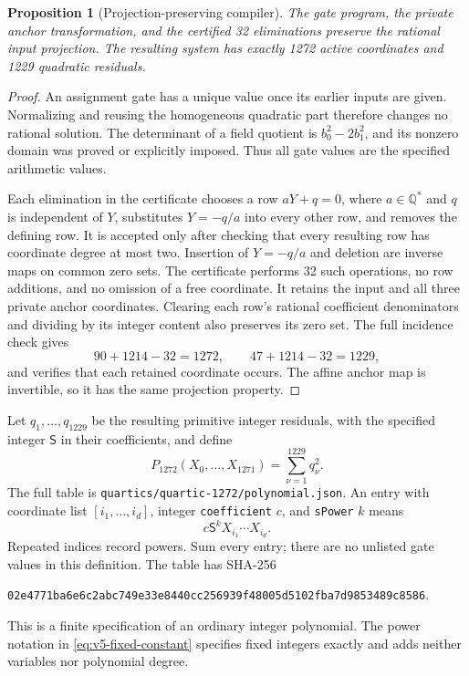 \documentclass[11pt]{article}
\newtheorem{proposition}[theorem]{Proposition}
\theoremstyle{definition}
\theoremstyle{remark}
\newcommand{\Q}{\mathbb Q}
\begin{document}
\begin{proposition}[Projection-preserving compiler]
\label{prop:v5-compiler-projection}
The gate program, the private anchor transformation, and the
certified 32 eliminations preserve the rational input projection.
The resulting system has exactly 1272 active coordinates and
1229 quadratic residuals.
\end{proposition}
\begin{proof}
An assignment gate has a unique value once its earlier inputs are
given. Normalizing and reusing the homogeneous quadratic part
therefore changes no rational solution. The determinant of a
field quotient is $b_0^2-2b_1^2$, and its nonzero domain was
proved or explicitly imposed. Thus all gate values are the
specified arithmetic values.

Each elimination in the certificate chooses a row $aY+q=0$,
where $a\in\Q^*$ and $q$ is independent of $Y$, substitutes
$Y=-q/a$ into every other row, and removes the defining row.
It is accepted only after checking that every resulting row has
coordinate degree at most two. Insertion of $Y=-q/a$ and deletion
are inverse maps on common zero sets. The certificate performs
32 such operations, no row additions, and no omission of a free
coordinate. It retains the input and all three private anchor
coordinates. Clearing each row's rational coefficient denominators
and dividing by its integer content also preserves its zero set.
The full incidence check gives
\[
 90+1214-32=1272,\qquad47+1214-32=1229,
\]
and verifies that each retained coordinate occurs. The affine
anchor map is invertible, so it has the same projection property.
\end{proof}

Let $q_1,\ldots,q_{1229}$ be the resulting primitive integer
residuals, with the specified integer $\mathsf S$ in their
coefficients, and define
\begin{equation}\label{eq:v5-final-polynomial}
 P_{1272}(X_0,\ldots,X_{1271})=\sum_{\nu=1}^{1229}q_\nu^2.
\end{equation}
The full table is \nolinkurl{quartics/quartic-1272/polynomial.json}.
An entry with coordinate list $[i_1,\ldots,i_d]$, integer
\texttt{coefficient} $c$, and \texttt{sPower} $k$ means
\[
 c\mathsf S^kX_{i_1}\cdots X_{i_d}.
\]
Repeated indices record powers. Sum every entry; there are no
unlisted gate values in this definition. The table has SHA-256
\begin{center}\small
\nolinkurl{02e4771ba6e6c2abc749e33e8440cc256939f48005d5102fba7d9853489c8586}.
\end{center}
This is a finite specification of an ordinary integer polynomial.
The power notation in \eqref{eq:v5-fixed-constant} specifies fixed
integers exactly and adds neither variables nor polynomial degree.
\end{document}

